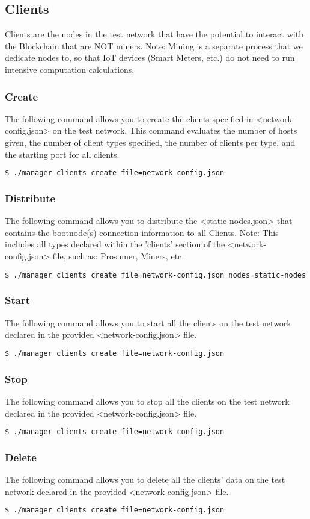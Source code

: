 \subsection{Clients}

Clients are the nodes in the test network that have the potential to interact with the Blockchain that are NOT miners. Note: Mining is a separate process that we dedicate nodes to, so that IoT devices (Smart Meters, etc.) do not need to run intensive computation calculations.  

\subsubsection{Create}
The following command allows you to create the clients specified in <network-config.json> on the test network. This command evaluates the number of hosts given, the number of client types specified, the number of clients per type, and the starting port for all clients.
\begin{lstlisting}[language=bash]
$ ./manager clients create file=network-config.json
\end{lstlisting}

\subsubsection{Distribute}
The following command allows you to distribute the <static-nodes.json> that contains the bootnode(s) connection information to all Clients. Note: This includes all types declared within the 'clients' section of the <network-config.json> file, such as: Prosumer, Miners, etc.
\begin{lstlisting}[language=bash]
$ ./manager clients create file=network-config.json nodes=static-nodes.json
\end{lstlisting}

\subsubsection{Start}
The following command allows you to start all the clients on the test network declared in the provided <network-config.json> file.
\begin{lstlisting}[language=bash]
$ ./manager clients create file=network-config.json
\end{lstlisting}

\subsubsection{Stop}
The following command allows you to stop all the clients on the test network declared in the provided <network-config.json> file.
\begin{lstlisting}[language=bash]
$ ./manager clients create file=network-config.json
\end{lstlisting}

\subsubsection{Delete}
The following command allows you to delete all the clients' data on the test network declared in the provided <network-config.json> file.
\begin{lstlisting}[language=bash]
$ ./manager clients create file=network-config.json
\end{lstlisting}